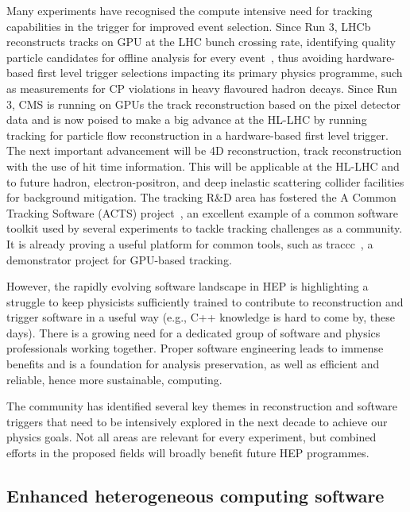 \documentclass[10pt,a4paper]{article}
\begin{document}
Many experiments have recognised the compute intensive need for tracking
capabilities in the trigger for improved event selection. Since Run 3, LHCb
reconstructs tracks on GPU at the LHC bunch crossing rate, identifying quality
particle candidates for offline analysis for every event~\cite{LHCb:HLT}, thus
avoiding hardware-based first level trigger selections impacting its primary
physics programme, such as measurements for CP violations in heavy flavoured
hadron decays. Since Run 3, CMS is running on GPUs the track reconstruction
based on the pixel detector data and is now poised to make a big advance at the
HL-LHC by running tracking for particle flow reconstruction in a hardware-based
first level trigger. The next important advancement will be 4D reconstruction,
track reconstruction with the use of hit time information. This will be
applicable at the HL-LHC and to future hadron, electron-positron, and deep
inelastic scattering collider facilities for background mitigation. The tracking
R\&D area has fostered the A Common Tracking Software (ACTS) project~\cite{Ai2022Common},
an excellent example of a common software toolkit used by several experiments to
tackle tracking challenges as a community. It is already proving a useful
platform for common tools, such as traccc~\cite{yeo_2023_8119769, traccc}, a
demonstrator project for GPU-based tracking.

However, the rapidly evolving software landscape in HEP is highlighting a
struggle to keep physicists sufficiently trained to contribute to reconstruction
and trigger software in a useful way (e.g., C++ knowledge is hard to come by,
these days). There is a growing need for a dedicated group of software and
physics professionals working together. Proper software engineering leads to
immense benefits and is a foundation for analysis preservation, as well as
efficient and reliable, hence more sustainable, computing.

The community has identified several key themes in reconstruction and software
triggers that need to be intensively explored in the next decade to achieve our
physics goals. Not all areas are relevant for every experiment, but combined
efforts in the proposed fields will broadly benefit future HEP programmes.

\subsection{Enhanced heterogeneous computing
software}\label{enhanced-heterogeneous-computing-software}
\end{document}
